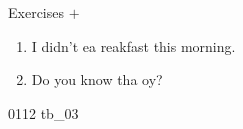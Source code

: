 \documentclass[aspectratio=169,xcolor={dvipsnames,table}]{beamer}
\begin{document}
\begin{frame}[plain]{Exercises  $+$ }
  \Large
  \begin{enumerate}
    \item<2-> I didn't ea \hspace{-2pt} reakfast this morning.
    \item<4-> Do you know tha  oy?
  \end{enumerate}

  \hfill{\tiny 0112}\,{\scriptsize {}\,tb\_03}

\end{frame}
\end{document}
